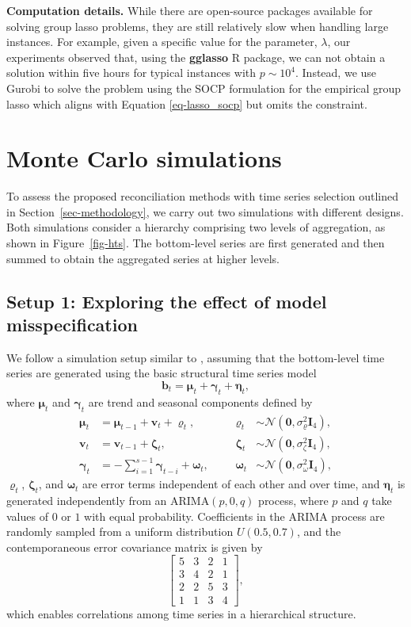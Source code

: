 \documentclass[
  11pt]{article}
\theoremstyle{plain}
\theoremstyle{remark}
\begin{document}
\textbf{Computation details.} While there are open-source packages
available for solving group lasso problems, they are still relatively
slow when handling large instances. For example, given a specific value
for the parameter, \(\lambda\), our experiments observed that, using the
\textbf{gglasso} R package, we can not obtain a solution within five
hours for typical instances with \(p \sim 10^4\). Instead, we use Gurobi
to solve the problem using the SOCP formulation for the empirical group
lasso which aligns with Equation \eqref{eq-lasso_socp} but omits the
constraint.

\section{Monte Carlo simulations}\label{sec-simulations}

To assess the proposed reconciliation methods with time series selection
outlined in Section~\ref{sec-methodology}, we carry out two simulations
with different designs. Both simulations consider a hierarchy comprising
two levels of aggregation, as shown in Figure~\ref{fig-hts}. The
bottom-level series are first generated and then summed to obtain the
aggregated series at higher levels.

\subsection{Setup 1: Exploring the effect of model
misspecification}\label{sec-sim1}

We follow a simulation setup similar to \citet{Wickramasuriya2019-fc},
assuming that the bottom-level time series are generated using the basic
structural time series model \[
\bm{b}_t=\bm{\mu}_t+\bm{\gamma}_t+\bm{\eta}_t,
\] where \(\bm{\mu}_t\) and \(\bm{\gamma}_t\) are trend and seasonal
components defined by \begin{align*}
\bm{\mu}_t & =\bm{\mu}_{t-1}+\bm{v}_t+\bm{\varrho}_t, &&& \bm{\varrho}_t & \sim \mathcal{N}\left(\bm{0}, \sigma_{\varrho}^2 \bm{I}_4\right), \\
\bm{v}_t & =\bm{v}_{t-1}+\bm{\zeta}_t, &&& \bm{\zeta}_t & \sim \mathcal{N}\left(\bm{0}, \sigma_\zeta^2 \bm{I}_4\right), \\
\bm{\gamma}_t & =-\sum_{i=1}^{s-1} \bm{\gamma}_{t-i}+\bm{\omega}_t, &&& \bm{\omega}_t & \sim \mathcal{N}\left(\bm{0}, \sigma_\omega^2 \bm{I}_4\right),
\end{align*} \(\bm{\varrho}_t\), \(\bm{\zeta}_t\), and \(\bm{\omega}_t\)
are error terms independent of each other and over time, and
\(\bm{\eta}_t\) is generated independently from an
\(\text{ARIMA}(p,0,q)\) process, where \(p\) and \(q\) take values of
\(0\) or \(1\) with equal probability. Coefficients in the ARIMA process
are randomly sampled from a uniform distribution \(U(0.5, 0.7)\), and
the contemporaneous error covariance matrix is given by \[
\left[\begin{array}{llll}
5 & 3 & 2 & 1 \\
3 & 4 & 2 & 1 \\
2 & 2 & 5 & 3 \\
1 & 1 & 3 & 4
\end{array}\right],
\] which enables correlations among time series in a hierarchical
structure.
\end{document}
